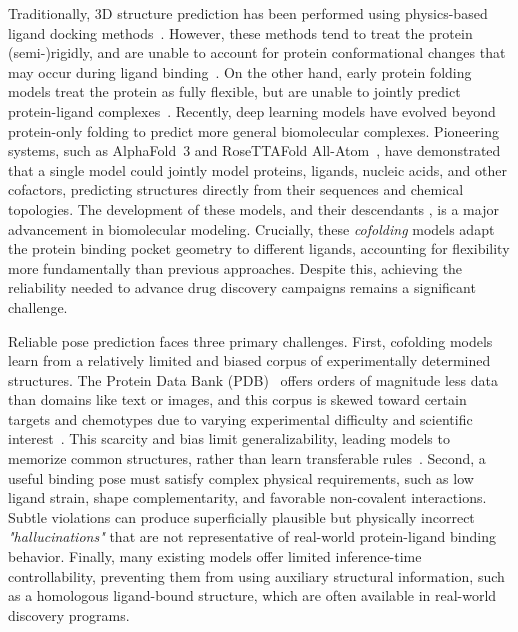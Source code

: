 \documentclass[11pt, letterpaper, onecolumn]{tau-class/tau}
\newcommand{\alphafold}[1]{AlphaFold~#1\xspace}
\begin{document}
Traditionally, 3D structure prediction has been performed using physics-based ligand docking methods~\cite{rarey_fast_1996,surflex,mcgann_gaussian_2003,gold,friesner_glide_2004,corbeil_variability_2012,venkatraman_flexible_2012,AutoDockVina}.
However, these methods tend to treat the protein (semi-)rigidly, and are unable to account for protein conformational changes that may occur during ligand binding~\cite{inducedfit1,inducedfit2,miller2021inducedfitdocking}.
On the other hand, early protein folding models treat the protein as fully flexible, but are unable to jointly predict protein-ligand complexes~\cite{af2}.
Recently, deep learning models have evolved beyond protein-only folding to predict more general biomolecular complexes.
Pioneering systems, such as \alphafold3 \cite{abramson2024accurate} and RoseTTAFold All-Atom~\cite{krishna2024rfaa}, have demonstrated that a single model could jointly model proteins, ligands, nucleic acids, and other cofactors, predicting structures directly from their sequences and chemical topologies.
The development of these models, and their descendants \cite{wohlwend2024boltz1, passaro2025boltz2, chai2024chai, bytedance2025protenix, liu2024helixfold3,qiao2024neuralplexer3}, is a major advancement in biomolecular modeling.
Crucially, these \emph{cofolding} models adapt the protein binding pocket geometry to different ligands, accounting for flexibility more fundamentally than previous approaches.
Despite this, achieving the reliability needed to advance drug discovery campaigns remains a significant challenge.

Reliable pose prediction faces three primary challenges. First, cofolding models learn from a relatively limited and biased corpus of experimentally determined structures. The Protein Data Bank (PDB)~\cite{berman2000protein} offers orders of magnitude less data than domains like text or images, and this corpus is skewed toward certain targets and chemotypes due to varying experimental difficulty and scientific interest~\cite{wwpdb_stats_2025}. This scarcity and bias limit generalizability, leading models to memorize common structures, rather than learn transferable rules~\cite{vskrinjar2025have}. Second, a useful binding pose must satisfy complex physical requirements, such as low ligand strain, shape complementarity, and favorable non-covalent interactions. Subtle violations can produce superficially plausible but physically incorrect \textit{"hallucinations"} that are not representative of real-world protein-ligand binding behavior. Finally, many existing models offer limited inference-time controllability, preventing them from using auxiliary structural information, such as a homologous ligand-bound structure, which are often available in real-world discovery programs.
\end{document}
